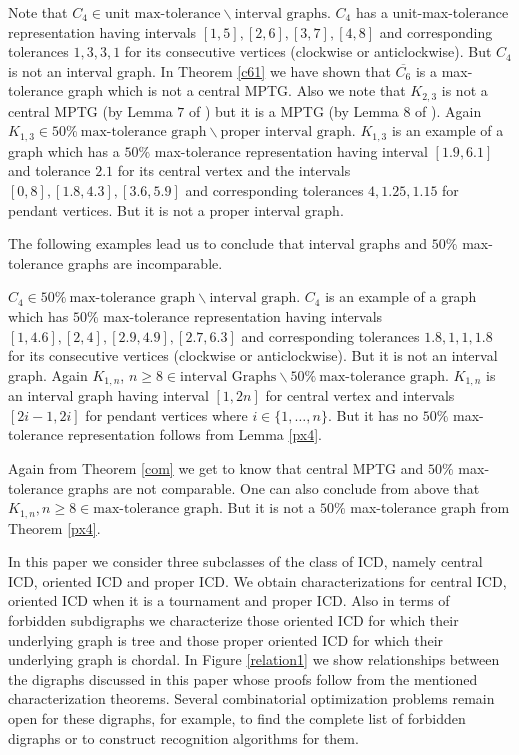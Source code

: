 \documentclass{article}
\theoremstyle{definition}
\numberwithin{equation}{section}
\begin{document}
\noindent Note that $C_{4}\in \text{unit max-tolerance}\smallsetminus \text{interval graphs}$. $C_{4}$ has a unit-max-tolerance representation having intervals $[1,5],[2,6],[3,7],[4,8]$ and corresponding tolerances $1,3,3,1$ for its consecutive vertices (clockwise or anticlockwise). But $C_{4}$ is not an interval graph. In Theorem \ref{c61} we have shown that $\overline{C_{6}}$ is a max-tolerance graph which is not a central MPTG. Also we note that $K_{2,3}$ is not a central MPTG (by Lemma $7$ of \cite{Soto}) but it is a MPTG (by Lemma $8$ of \cite{Soto}). Again  $K_{1,3}\in 50\%\ \text{max-tolerance graph}\smallsetminus \text{proper interval graph}$. $K_{1,3}$ is an example of a graph which has a $50\%$ max-tolerance representation having interval $[1.9,6.1]$ and tolerance $2.1$ for its central vertex and the intervals $[0,8],[1.8,4.3],[3.6,5.9]$ and corresponding tolerances $4,1.25,1.15$ for pendant vertices. But it is not a proper interval graph.

\vspace{.2em}\noindent The following examples lead us to conclude that interval graphs and $50\%$ max-tolerance graphs are incomparable.

\vspace{.2em}\noindent $C_{4}\in 50\%\ \text{max-tolerance graph}\smallsetminus \text{interval graph}$. $C_{4}$ is an example of a graph which has $50\%$ max-tolerance representation having intervals $[1,4.6],[2,4],[2.9,4.9],[2.7,6.3]$ and corresponding tolerances $1.8,1,1,1.8$ for its consecutive vertices (clockwise or anticlockwise). But it is not an interval graph. Again $K_{1,n}$, $n\geq 8 \in \text{interval Graphs}\smallsetminus 50\%\ \text{max-tolerance graph}$. $K_{1,n}$ is an interval graph having interval $[1,2n]$ for central vertex and intervals $[2i-1,2i]$ for pendant vertices where $i\in\{1,\hdots,n\}$. But it has no $50\%$ max-tolerance representation follows from Lemma \ref{px4}.

\noindent Again from Theorem \ref{com} we get to know that central MPTG and $50\%$ max-tolerance graphs are not comparable. One can also conclude from above that $K_{1,n},n\geq 8\in \text{max-tolerance graph}
$. But it is not a $50\%$ max-tolerance graph from Theorem \ref{px4}. 

\noindent In this paper we consider three subclasses of the class of ICD, namely central ICD, oriented ICD and proper ICD. We obtain characterizations for central ICD, oriented ICD when it is a tournament and proper ICD. Also in terms of forbidden subdigraphs we characterize those oriented ICD for which their underlying graph is tree and those proper oriented ICD for which their underlying graph is chordal. In Figure \ref{relation1} we show relationships between the digraphs discussed in this paper whose proofs follow from the mentioned characterization theorems. Several combinatorial optimization problems remain open for these digraphs, for example, to find the complete list of forbidden digraphs or to construct recognition algorithms for them. 
\end{document}
